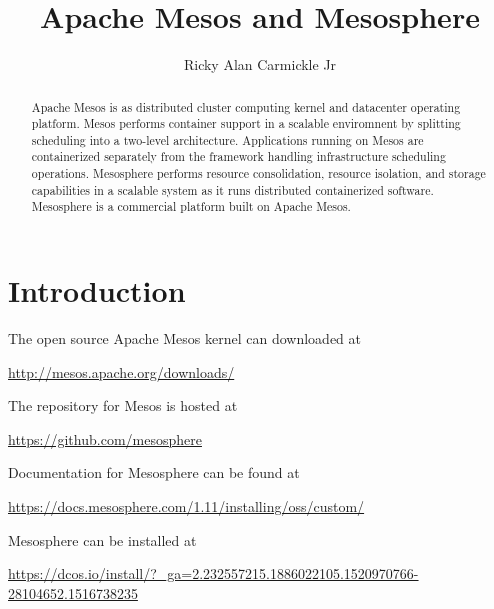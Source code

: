 
\title{Apache Mesos and Mesosphere}


\author{Ricky Alan Carmickle Jr}


\renewcommand{\shortauthors}{R. A. Carmickle Jr.}


\begin{abstract}

Apache Mesos is as distributed cluster computing kernel and datacenter operating platform.  Mesos performs container support in a scalable enviromnent by splitting scheduling into a two-level architecture. Applications running on Mesos are containerized separately from the framework handling infrastructure scheduling operations. Mesosphere performs resource consolidation, resource isolation, and storage capabilities in a scalable system as it runs distributed containerized software. Mesosphere is a commercial platform built on Apache Mesos.


\end{abstract}



\maketitle


\section{Introduction}

The open source Apache Mesos kernel can downloaded at

\url{http://mesos.apache.org/downloads/}

The repository for Mesos is hosted at 

\url{https://github.com/mesosphere}

Documentation for Mesosphere can be found at

\url{https://docs.mesosphere.com/1.11/installing/oss/custom/}

Mesosphere can be installed at

\url{https://dcos.io/install/?_ga=2.232557215.1886022105.1520970766-28104652.1516738235}

